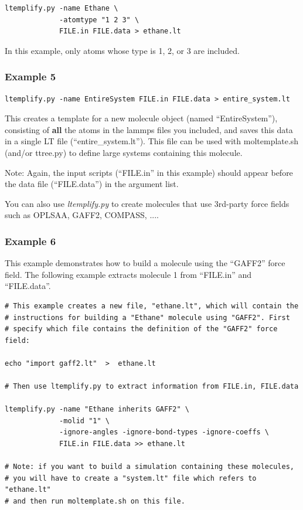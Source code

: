 \documentclass[11pt]{article}
\begin{document}
\begin{verbatim}
ltemplify.py -name Ethane \
             -atomtype "1 2 3" \
             FILE.in FILE.data > ethane.lt
\end{verbatim}

    In this example, only atoms whose type is 1, 2, or 3 are included.


    

\subsubsection*{Example 5}

\begin{verbatim}
ltemplify.py -name EntireSystem FILE.in FILE.data > entire_system.lt
\end{verbatim}

This creates a template for a new molecule object (named ``EntireSystem''),
consisting of \textbf{all} the atoms in the lammps files you included,
and saves this data in a single LT file (``entire\_system.lt'').
This file can be used with moltemplate.sh (and/or ttree.py) to
define large systems containing this molecule.

Note: Again, the input scripts (``FILE.in'' in this example) should appear 
      before the data file (``FILE.data'') in the argument list.


\label{sec:ltemplify_examples_force_fields}


You can also use \textit{ltemplify.py} to create molecules that use 3rd-party
force fields such as OPLSAA, GAFF2, COMPASS, ....


\subsubsection*{ Example 6 }

This example demonstrates how to build a molecule
using the ``GAFF2'' force field.
The following example extracts molecule 1 from ``FILE.in'' and ``FILE.data''.

\begin{verbatim}
# This example creates a new file, "ethane.lt", which will contain the
# instructions for building a "Ethane" molecule using "GAFF2". First
# specify which file contains the definition of the "GAFF2" force field:

echo "import gaff2.lt"  >  ethane.lt

# Then use ltemplify.py to extract information from FILE.in, FILE.data

ltemplify.py -name "Ethane inherits GAFF2" \
             -molid "1" \
             -ignore-angles -ignore-bond-types -ignore-coeffs \
             FILE.in FILE.data >> ethane.lt

# Note: if you want to build a simulation containing these molecules,
# you will have to create a "system.lt" file which refers to "ethane.lt"
# and then run moltemplate.sh on this file.
\end{verbatim}
\end{document}
